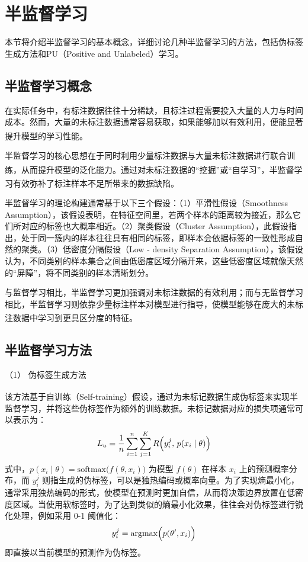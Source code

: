 \section{半监督学习}
本节将介绍半监督学习的基本概念，详细讨论几种半监督学习的方法，包括伪标签生成方法和PU（Positive and Unlabeled）学习。
\subsection{半监督学习概念}
在实际任务中，有标注数据往往十分稀缺，且标注过程需要投入大量的人力与时间成本。然而，大量的未标注数据通常容易获取，如果能够加以有效利用，便能显著提升模型的学习性能\textsuperscript{\cite{2015Semi}}。

半监督学习的核心思想在于同时利用少量标注数据与大量未标注数据进行联合训练，从而提升模型的泛化能力\textsuperscript{\cite{van2020survey}}。通过对未标注数据的“挖掘”或“自学习”，半监督学习有效弥补了标注样本不足所带来的数据缺陷\textsuperscript{\cite{van2020survey}}。

半监督学习的理论构建通常基于以下三个假设：（1）平滑性假设（Smoothness Assumption），该假设表明，在特征空间里，若两个样本的距离较为接近，那么它们所对应的标签也大概率相近。（2）聚类假设（Cluster Assumption），此假设指出，处于同一簇内的样本往往具有相同的标签，即样本会依据标签的一致性形成自然的聚类。（3）低密度分隔假设（Low - density Separation Assumption），该假设认为，不同类别的样本集合之间由低密度区域分隔开来，这些低密度区域就像天然的“屏障”，将不同类别的样本清晰划分。

与监督学习相比，半监督学习更加强调对未标注数据的有效利用；而与无监督学习相比，半监督学习则依靠少量标注样本对模型进行指导，使模型能够在庞大的未标注数据中学习到更具区分度的特征\textsuperscript{\cite{van2020survey}}。
\subsection{半监督学习方法}

（1） 伪标签生成方法

该方法基于自训练（Self-training）假设\textsuperscript{\cite{lee2013pseudo}}，通过为未标记数据生成伪标签来实现半监督学习，并将这些伪标签作为额外的训练数据。未标记数据对应的损失项通常可以表示为：
\begin{equation}\label{eq:2-1}
	L_u = \frac{1}{n} \sum_{i=1}^{n} \sum_{j=1}^{K} R \Bigl( y_i^{j}, \, p(x_i \mid \theta) \Bigr)
\end{equation}
式中，$ p(x_i \mid \theta) = \mathrm{softmax}\bigl(f(\theta, x_i)\bigr) $ 为模型 $ f(\theta) $ 在样本 $ x_i $ 上的预测概率分布，而 $ y_i^{j} $ 则指生成的伪标签，可以是独热编码或概率向量。为了实现熵最小化，通常采用独热编码的形式，使模型在预测时更加自信，从而将决策边界放置在低密度区域。当使用软标签时，为了达到类似的熵最小化效果，往往会对伪标签进行锐化处理，例如采用 0-1 阈值化：
\begin{equation}\label{eq:2-2}
	y_i^{j} = \mathrm{argmax}\Bigl(p(\theta', x_i)\Bigr)
\end{equation}
即直接以当前模型的预测作为伪标签。

